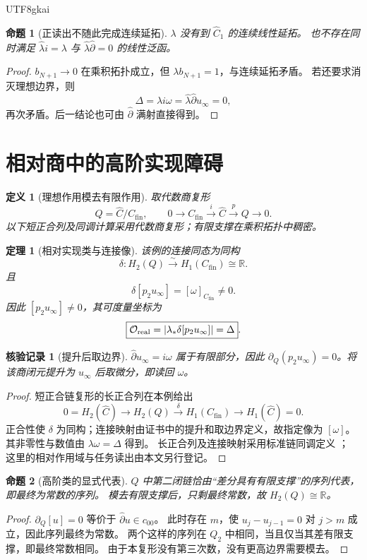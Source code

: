 \documentclass[12pt,a4paper,openany]{report}
\newtheorem{definition}{定义}[chapter]
\newtheorem{theorem}{定理}[chapter]
\newtheorem{proposition}{命题}[chapter]
\newtheorem{Certificate}{核验记录}[chapter]
\numberwithin{equation}{chapter}
\newcommand{\RR}{\mathbb R}
\newcommand{\cfin}{C_{\mathrm{fin}}}
\newcommand{\chat}{\widehat C}
\newcommand{\Abs}[1]{\left\lvert#1\right\rvert}
\begin{document}
\begin{CJK*}{UTF8}{gkai}
\begin{proposition}[正读出不随此完成连续延拓]
\label{prop:lambda-not-extend}
$\lambda$ 没有到 $\widehat C_1$ 的连续线性延拓。
也不存在同时满足 $\widehat\lambda i=\lambda$ 与
$\widehat\lambda\widehat\partial=0$ 的线性泛函。
\end{proposition}
\begin{proof}
$b_{N+1}\to0$ 在乘积拓扑成立，但 $\lambda b_{N+1}=1$，与连续延拓矛盾。
若还要求消灭理想边界，则
\[
 \Delta=\widehat\lambda i\omega
 =\widehat\lambda\widehat\partial u_\infty=0,
\]
再次矛盾。后一结论也可由 $\widehat\partial$ 满射直接得到。
\end{proof}

\section{相对商中的高阶实现障碍}

\begin{definition}[理想作用模去有限作用]
取代数商复形
\[
 Q=\chat/\cfin,\qquad
 0\longrightarrow\cfin\xrightarrow{i}\chat\xrightarrow{p}Q\longrightarrow0.
\]
以下短正合列及同调计算采用代数商复形；有限支撑在乘积拓扑中稠密。
\end{definition}

\begin{theorem}[相对实现类与连接像]
\label{thm:relative-example}
该例的连接同态为同构
\[
 \delta:H_2(Q)\xrightarrow{\sim}H_1(\cfin)\cong\RR.
\]
且
\[
 \boxed{\delta[p_2u_\infty]=[\omega]_{\cfin}\ne0}.
\]
因此 $[p_2u_\infty]\ne0$，其可度量坐标为
\[
 \boxed{\mathcal O_{\rm real}
       =\Abs{\lambda_*\delta[p_2u_\infty]}=\Delta}.
\]
\end{theorem}
\begin{Certificate}[提升后取边界]
$\widehat\partial u_\infty=i\omega$ 属于有限部分，因此
$\partial_Q(p_2u_\infty)=0$。将该商闭元提升为 $u_\infty$ 后取微分，即读回 $\omega$。
\end{Certificate}
\begin{proof}
短正合链复形的长正合列在本例给出
\[
 0=H_2(\chat)\longrightarrow H_2(Q)
 \xrightarrow{\delta}H_1(\cfin)
 \longrightarrow H_1(\chat)=0.
\]
正合性使 $\delta$ 为同构；连接映射由证书中的提升和取边界定义，故指定像为 $[\omega]$。
其非零性与数值由 $\lambda\omega=\Delta$ 得到。
长正合列及连接映射采用标准链同调定义 \cite[第 2 章]{Hatcher2002}；
这里的相对作用域与任务读出由本文另行登记。
\end{proof}

\begin{proposition}[高阶类的显式代表]
$Q$ 中第二闭链恰由“差分具有有限支撑”的序列代表，即最终为常数的序列。
模去有限支撑后，只剩最终常数，故 $H_2(Q)\cong\RR$。
\end{proposition}
\begin{proof}
$\partial_Q[u]=0$ 等价于 $\widehat\partial u\in c_{00}$。
此时存在 $m$，使 $u_j-u_{j-1}=0$ 对 $j>m$ 成立，因此序列最终为常数。
两个这样的序列在 $Q_2$ 中相同，当且仅当其差有限支撑，即最终常数相同。
由于本复形没有第三次数，没有更高边界需要模去。
\end{proof}


\end{CJK*}
\end{document}
